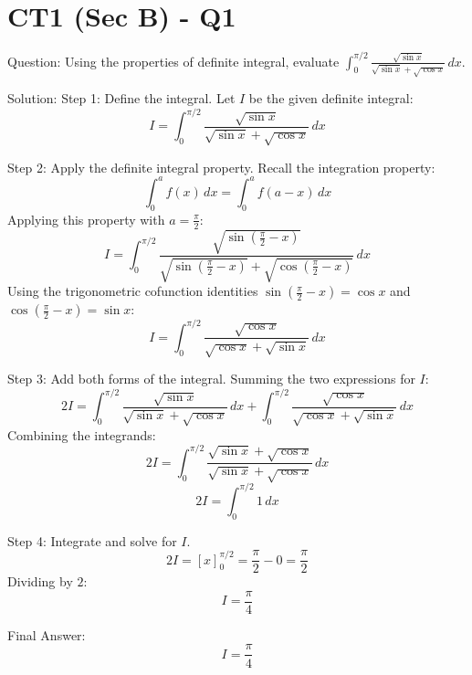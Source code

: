 \documentclass{article}
\begin{document}
\section*{CT1 (Sec B) - Q1}
Question:
Using the properties of definite integral, evaluate $\int_0^{\pi/2} \frac{\sqrt{\sin x}}{\sqrt{\sin x} + \sqrt{\cos x}} \, dx$.

Solution:
Step 1: Define the integral.
Let $I$ be the given definite integral:
\[
I = \int_0^{\pi/2} \frac{\sqrt{\sin x}}{\sqrt{\sin x} + \sqrt{\cos x}} \, dx
\]

Step 2: Apply the definite integral property.
Recall the integration property:
\[
\int_0^a f(x) \, dx = \int_0^a f(a - x) \, dx
\]
Applying this property with $a = \frac{\pi}{2}$:
\[
I = \int_0^{\pi/2} \frac{\sqrt{\sin\left(\frac{\pi}{2} - x\right)}}{\sqrt{\sin\left(\frac{\pi}{2} - x\right)} + \sqrt{\cos\left(\frac{\pi}{2} - x\right)}} \, dx
\]
Using the trigonometric cofunction identities $\sin\left(\frac{\pi}{2} - x\right) = \cos x$ and $\cos\left(\frac{\pi}{2} - x\right) = \sin x$:
\[
I = \int_0^{\pi/2} \frac{\sqrt{\cos x}}{\sqrt{\cos x} + \sqrt{\sin x}} \, dx
\]

Step 3: Add both forms of the integral.
Summing the two expressions for $I$:
\[
2I = \int_0^{\pi/2} \frac{\sqrt{\sin x}}{\sqrt{\sin x} + \sqrt{\cos x}} \, dx + \int_0^{\pi/2} \frac{\sqrt{\cos x}}{\sqrt{\cos x} + \sqrt{\sin x}} \, dx
\]
Combining the integrands:
\[
2I = \int_0^{\pi/2} \frac{\sqrt{\sin x} + \sqrt{\cos x}}{\sqrt{\sin x} + \sqrt{\cos x}} \, dx
\]
\[
2I = \int_0^{\pi/2} 1 \, dx
\]

Step 4: Integrate and solve for $I$.
\[
2I = [x]_0^{\pi/2} = \frac{\pi}{2} - 0 = \frac{\pi}{2}
\]
Dividing by $2$:
\[
I = \frac{\pi}{4}
\]

Final Answer:
\[
\boxed{I = \frac{\pi}{4}}
\]

\end{document}

